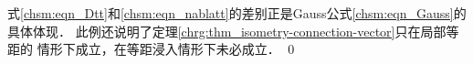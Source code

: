 式\eqref{chsm:eqn_Dtt}和\eqref{chsm:eqn_nablatt}的差别正是Gauss公式\eqref{chsm:eqn_Gauss}的具体体现．
此例还说明了定理\ref{chrg:thm_isometry-connection-vector}只在{\kaishu 局部等距}的
情形下成立，在等距浸入情形下未必成立．
\qed


